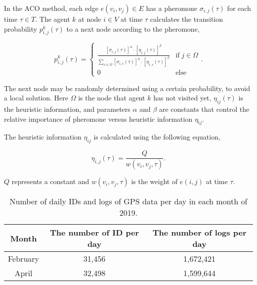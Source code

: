 \documentclass[conference]{IEEEtran}
\begin{document}
\par In the ACO method, each edge $e(v_i, v_j) \in E$ has a pheromone $\sigma _{i,j}(\tau)$ for each time $\tau \in T$.
The agent $k$ at node $i \in V$ at time $\tau$ calculates the transition probability $p_{i,j}^k(\tau)$ to a next node according to the pheromone,

\begin{equation}
\label{probability}
p_{i,j}^k(\tau ) = \begin{cases} \frac{{{{\left[ {{\sigma _{i,j}}(\tau)} \right]}^\alpha } \cdot {{\left[ {{\eta _{i,j}}(\tau)} \right]}^\beta }}}{{\sum\nolimits_{s \in \Omega} {{{\left[ {{\sigma _{i,s}}(\tau )} \right]}^\alpha } \cdot {{\left[ {{\eta _{i,s}}(\tau )} \right]}^\beta }} }} & {\text{if}}\;j \in \Omega \\ 0 &  {\text{else }} \end{cases}.
\end{equation}

The next node may be randomly determined using a certain probability, to avoid a local solution.
Here $\Omega$ is the node that agent $k$ has not visited yet, $\eta_{ij}(\tau)$ is the heuristic information, and parameters $\alpha$ and $\beta$ are constants that control the relative importance of pheromone versus heuristic information $\eta_{ij}$.

\par The heuristic information $\eta_{ij}$ is calculated using the following equation,

\begin{equation}
\eta _{i,j}(\tau) = {\frac {Q} {w(v_i,v_j,\tau)}}.
\end{equation}

$Q$ represents a constant and ${w(v_i,v_j,\tau)}$ is the weight of $e(i,j)$ at time $\tau$.

\begin{table}[t]
 \begin{center}
   \caption{Number of daily IDs and logs of GPS data per day in each month of 2019.}
   \begin{tabular}{|c||c|c|} \hline
   Month&The number of ID per day&The number of logs per day \\ \hline
   February &31,456&1,672,421\\ \hline
   April &32,498&1,599,644\\ \hline
   \end{tabular}
  \label{fig:summary}
 \end{center}
\end{table}
\end{document}

